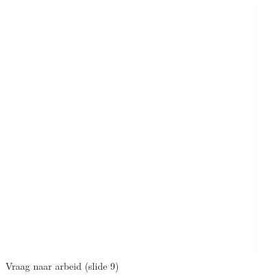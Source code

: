 \begin{figure}[htbp]
   \centering
   \includegraphics[scale=0.4]{Images/white.png}
   \caption{Vraag naar arbeid (slide 9)}
   \label{fig:vraagNaarArbeid}
\end{figure}
